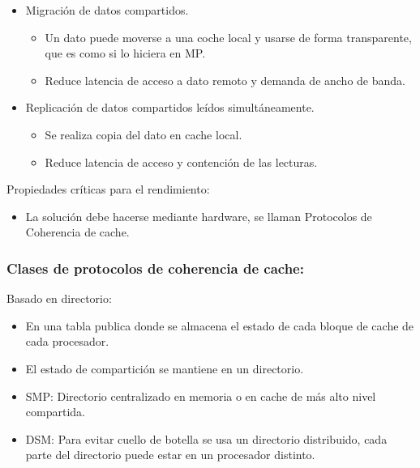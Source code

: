 \documentclass[12pt, twoside, openright]{report} %
\begin{document}
      \begin{itemize}
      
      \item
        Migración de datos compartidos.

        \begin{itemize}
        
        \item
          Un dato puede moverse a una coche local y usarse de forma
          transparente, que es como si lo hiciera en MP.
        \item
          Reduce latencia de acceso a dato remoto y demanda de ancho
          de banda.
        \end{itemize}
      \item
        Replicación de datos compartidos leídos simultáneamente.

        \begin{itemize}
        
        \item
          Se realiza copia del dato en cache local.
        \item
          Reduce latencia de acceso y contención de las lecturas.
        \end{itemize}
      \end{itemize}

      Propiedades críticas para el rendimiento:

      \begin{itemize}
      
      \item
        La solución debe hacerse mediante hardware, se llaman
        Protocolos de Coherencia de cache.
      \end{itemize}

\subsubsection{Clases de protocolos de coherencia de cache:}

   

      Basado en directorio:

      \begin{itemize}
      
      \item
        En una tabla publica donde se almacena el estado de cada
        bloque de cache de cada procesador.
      \item
        El estado de compartición se mantiene en un directorio.
      \item
        SMP: Directorio centralizado en memoria o en cache de más alto
        nivel compartida.
      \item
        DSM: Para evitar cuello de botella se usa un directorio
        distribuido, cada parte del directorio puede estar en un
        procesador distinto.
      \end{itemize}
\end{document}

